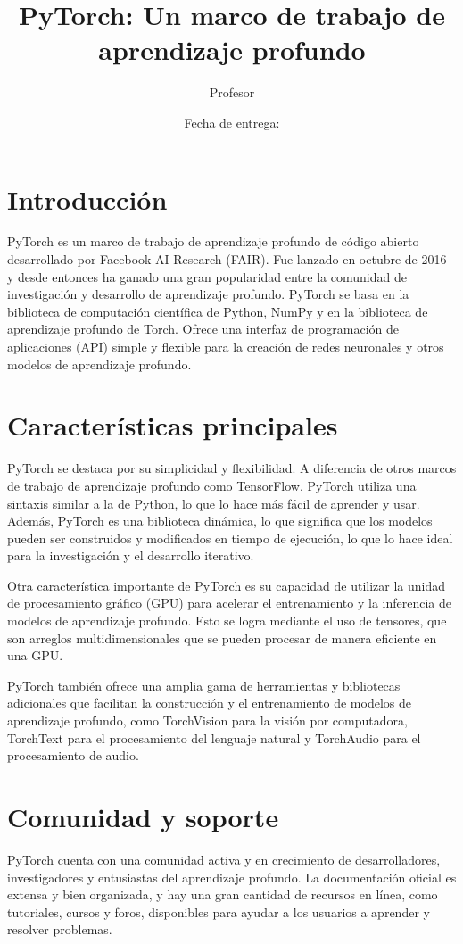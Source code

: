 \documentclass{article}
\title{PyTorch: Un marco de trabajo de aprendizaje profundo}
\author{Profesor}
\date{Fecha de entrega:}
\begin{document}
\maketitle

\section{Introducción}
PyTorch es un marco de trabajo de aprendizaje profundo de código abierto desarrollado por Facebook AI Research (FAIR). Fue lanzado en octubre de 2016 y desde entonces ha ganado una gran popularidad entre la comunidad de investigación y desarrollo de aprendizaje profundo. PyTorch se basa en la biblioteca de computación científica de Python, NumPy y en la biblioteca de aprendizaje profundo de Torch. Ofrece una interfaz de programación de aplicaciones (API) simple y flexible para la creación de redes neuronales y otros modelos de aprendizaje profundo.

\section{Características principales}
PyTorch se destaca por su simplicidad y flexibilidad. A diferencia de otros marcos de trabajo de aprendizaje profundo como TensorFlow, PyTorch utiliza una sintaxis similar a la de Python, lo que lo hace más fácil de aprender y usar. Además, PyTorch es una biblioteca dinámica, lo que significa que los modelos pueden ser construidos y modificados en tiempo de ejecución, lo que lo hace ideal para la investigación y el desarrollo iterativo.

Otra característica importante de PyTorch es su capacidad de utilizar la unidad de procesamiento gráfico (GPU) para acelerar el entrenamiento y la inferencia de modelos de aprendizaje profundo. Esto se logra mediante el uso de tensores, que son arreglos multidimensionales que se pueden procesar de manera eficiente en una GPU.

PyTorch también ofrece una amplia gama de herramientas y bibliotecas adicionales que facilitan la construcción y el entrenamiento de modelos de aprendizaje profundo, como TorchVision para la visión por computadora, TorchText para el procesamiento del lenguaje natural y TorchAudio para el procesamiento de audio.

\section{Comunidad y soporte}
PyTorch cuenta con una comunidad activa y en crecimiento de desarrolladores, investigadores y entusiastas del aprendizaje profundo. La documentación oficial es extensa y bien organizada, y hay una gran cantidad de recursos en línea, como tutoriales, cursos y foros, disponibles para ayudar a los usuarios a aprender y resolver problemas.
\end{document}
